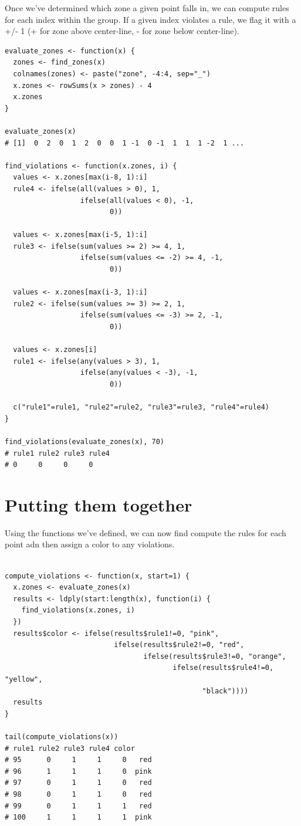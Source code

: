 \documentclass[a4paper,12pt]{article}
\begin{document}
Once we've determined which zone a given point falls in, we can compute rules for each index within the group. If a given index violates a rule, we flag it with a +/- 1 (+ for zone above center-line, - for zone below center-line).

\begin{framed}
\begin{verbatim}
evaluate_zones <- function(x) {
  zones <- find_zones(x)
  colnames(zones) <- paste("zone", -4:4, sep="_")
  x.zones <- rowSums(x > zones) - 4
  x.zones
}
 
evaluate_zones(x)
# [1]  0  2  0  1  2  0  0  1 -1  0 -1  1  1  1 -2  1 ...
 
find_violations <- function(x.zones, i) {
  values <- x.zones[max(i-8, 1):i]
  rule4 <- ifelse(all(values > 0), 1,
                  ifelse(all(values < 0), -1,
                         0))
 
  values <- x.zones[max(i-5, 1):i]
  rule3 <- ifelse(sum(values >= 2) >= 4, 1,
                  ifelse(sum(values <= -2) >= 4, -1,
                         0))
  
  values <- x.zones[max(i-3, 1):i]
  rule2 <- ifelse(sum(values >= 3) >= 2, 1,
                  ifelse(sum(values <= -3) >= 2, -1,
                         0))
  
  values <- x.zones[i]
  rule1 <- ifelse(any(values > 3), 1,
                  ifelse(any(values < -3), -1,
                         0))
  
  c("rule1"=rule1, "rule2"=rule2, "rule3"=rule3, "rule4"=rule4)
}
 
find_violations(evaluate_zones(x), 70)
# rule1 rule2 rule3 rule4 
# 0     0     0     0 
\end{verbatim}
\end{framed}
\newpage

\section{Putting them together}

Using the functions we've defined, we can now find compute the rules for each point adn then assign a color to any violations.
\begin{verbatim}

compute_violations <- function(x, start=1) {
  x.zones <- evaluate_zones(x)
  results <- ldply(start:length(x), function(i) {
    find_violations(x.zones, i)
  })
  results$color <- ifelse(results$rule1!=0, "pink",
                          ifelse(results$rule2!=0, "red",
                                 ifelse(results$rule3!=0, "orange",
                                        ifelse(results$rule4!=0, "yellow",
                                               "black"))))
  results
}
 
tail(compute_violations(x))
# rule1 rule2 rule3 rule4 color
# 95      0     1     1     0   red
# 96      1     1     1     0  pink
# 97      0     1     1     0   red
# 98      0     1     1     0   red
# 99      0     1     1     1   red
# 100     1     1     1     1  pink
\end{verbatim}
\newpage
\end{document}
